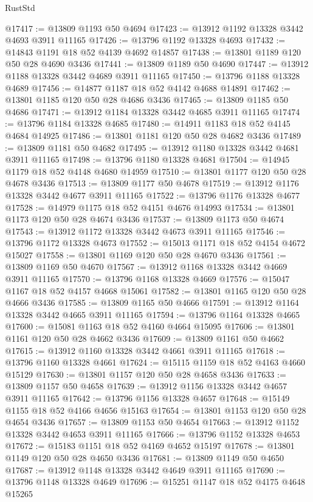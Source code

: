\begin{lexlean}{RustStd}
\begin{coremodule}
@17417 := @13809 @1193 @50 @4694
@17423 := @13912 @1192 @13328 @3442 @4693 @3911 @11165
@17426 := @13796 @1192 @13328 @4693
@17432 := @14843 @1191 @18 @52 @4139 @4692 @14857
@17438 := @13801 @1189 @120 @50 @28 @4690 @3436
@17441 := @13809 @1189 @50 @4690
@17447 := @13912 @1188 @13328 @3442 @4689 @3911 @11165
@17450 := @13796 @1188 @13328 @4689
@17456 := @14877 @1187 @18 @52 @4142 @4688 @14891
@17462 := @13801 @1185 @120 @50 @28 @4686 @3436
@17465 := @13809 @1185 @50 @4686
@17471 := @13912 @1184 @13328 @3442 @4685 @3911 @11165
@17474 := @13796 @1184 @13328 @4685
@17480 := @14911 @1183 @18 @52 @4145 @4684 @14925
@17486 := @13801 @1181 @120 @50 @28 @4682 @3436
@17489 := @13809 @1181 @50 @4682
@17495 := @13912 @1180 @13328 @3442 @4681 @3911 @11165
@17498 := @13796 @1180 @13328 @4681
@17504 := @14945 @1179 @18 @52 @4148 @4680 @14959
@17510 := @13801 @1177 @120 @50 @28 @4678 @3436
@17513 := @13809 @1177 @50 @4678
@17519 := @13912 @1176 @13328 @3442 @4677 @3911 @11165
@17522 := @13796 @1176 @13328 @4677
@17528 := @14979 @1175 @18 @52 @4151 @4676 @14993
@17534 := @13801 @1173 @120 @50 @28 @4674 @3436
@17537 := @13809 @1173 @50 @4674
@17543 := @13912 @1172 @13328 @3442 @4673 @3911 @11165
@17546 := @13796 @1172 @13328 @4673
@17552 := @15013 @1171 @18 @52 @4154 @4672 @15027
@17558 := @13801 @1169 @120 @50 @28 @4670 @3436
@17561 := @13809 @1169 @50 @4670
@17567 := @13912 @1168 @13328 @3442 @4669 @3911 @11165
@17570 := @13796 @1168 @13328 @4669
@17576 := @15047 @1167 @18 @52 @4157 @4668 @15061
@17582 := @13801 @1165 @120 @50 @28 @4666 @3436
@17585 := @13809 @1165 @50 @4666
@17591 := @13912 @1164 @13328 @3442 @4665 @3911 @11165
@17594 := @13796 @1164 @13328 @4665
@17600 := @15081 @1163 @18 @52 @4160 @4664 @15095
@17606 := @13801 @1161 @120 @50 @28 @4662 @3436
@17609 := @13809 @1161 @50 @4662
@17615 := @13912 @1160 @13328 @3442 @4661 @3911 @11165
@17618 := @13796 @1160 @13328 @4661
@17624 := @15115 @1159 @18 @52 @4163 @4660 @15129
@17630 := @13801 @1157 @120 @50 @28 @4658 @3436
@17633 := @13809 @1157 @50 @4658
@17639 := @13912 @1156 @13328 @3442 @4657 @3911 @11165
@17642 := @13796 @1156 @13328 @4657
@17648 := @15149 @1155 @18 @52 @4166 @4656 @15163
@17654 := @13801 @1153 @120 @50 @28 @4654 @3436
@17657 := @13809 @1153 @50 @4654
@17663 := @13912 @1152 @13328 @3442 @4653 @3911 @11165
@17666 := @13796 @1152 @13328 @4653
@17672 := @15183 @1151 @18 @52 @4169 @4652 @15197
@17678 := @13801 @1149 @120 @50 @28 @4650 @3436
@17681 := @13809 @1149 @50 @4650
@17687 := @13912 @1148 @13328 @3442 @4649 @3911 @11165
@17690 := @13796 @1148 @13328 @4649
@17696 := @15251 @1147 @18 @52 @4175 @4648 @15265

\end{coremodule}
\end{lexlean}
